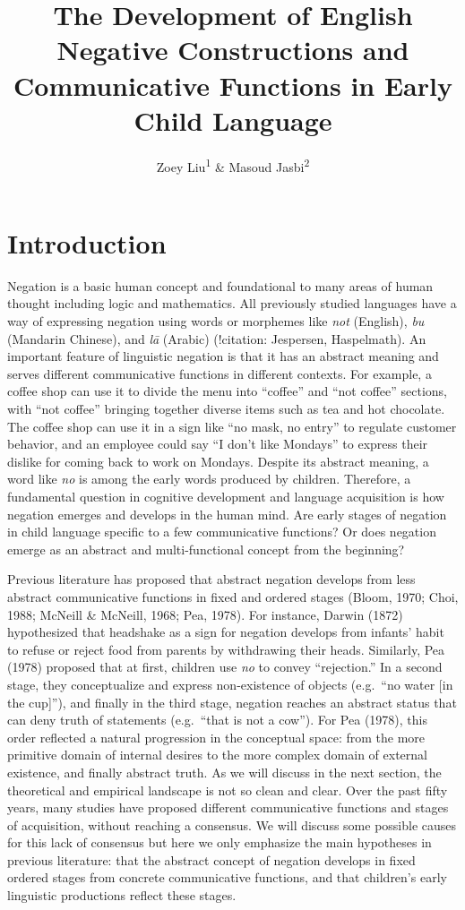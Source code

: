 \documentclass[
  english,
  man,floatsintext]{apa6}
\title{The Development of English Negative Constructions and Communicative Functions in Early Child Language}
\author{Zoey Liu\textsuperscript{1} \& Masoud Jasbi\textsuperscript{2}}
\date{}
\affiliation{\vspace{0.5cm}\textsuperscript{1} Boston College\\\textsuperscript{2} Uinversity of California, Davis}
\begin{document}
\maketitle

\hypertarget{introduction}{%
\section{Introduction}\label{introduction}}

Negation is a basic human concept and foundational to many areas of human thought including logic and mathematics. All previously studied languages have a way of expressing negation using words or morphemes like \emph{not} (English), \emph{bu} (Mandarin Chinese), and \emph{lā} (Arabic) (!citation: Jespersen, Haspelmath). An important feature of linguistic negation is that it has an abstract meaning and serves different communicative functions in different contexts. For example, a coffee shop can use it to divide the menu into ``coffee'' and ``not coffee'' sections, with ``not coffee'' bringing together diverse items such as tea and hot chocolate. The coffee shop can use it in a sign like ``no mask, no entry'' to regulate customer behavior, and an employee could say ``I don't like Mondays'' to express their dislike for coming back to work on Mondays. Despite its abstract meaning, a word like \emph{no} is among the early words produced by children. Therefore, a fundamental question in cognitive development and language acquisition is how negation emerges and develops in the human mind. Are early stages of negation in child language specific to a few communicative functions? Or does negation emerge as an abstract and multi-functional concept from the beginning?

Previous literature has proposed that abstract negation develops from less abstract communicative functions in fixed and ordered stages (Bloom, 1970; Choi, 1988; McNeill \& McNeill, 1968; Pea, 1978). For instance, Darwin (1872) hypothesized that headshake as a sign for negation develops from infants' habit to refuse or reject food from parents by withdrawing their heads. Similarly, Pea (1978) proposed that at first, children use \emph{no} to convey ``rejection.'' In a second stage, they conceptualize and express non-existence of objects (e.g.~``no water {[}in the cup{]}''), and finally in the third stage, negation reaches an abstract status that can deny truth of statements (e.g.~``that is not a cow''). For Pea (1978), this order reflected a natural progression in the conceptual space: from the more primitive domain of internal desires to the more complex domain of external existence, and finally abstract truth. As we will discuss in the next section, the theoretical and empirical landscape is not so clean and clear. Over the past fifty years, many studies have proposed different communicative functions and stages of acquisition, without reaching a consensus. We will discuss some possible causes for this lack of consensus but here we only emphasize the main hypotheses in previous literature: that the abstract concept of negation develops in fixed ordered stages from concrete communicative functions, and that children's early linguistic productions reflect these stages.
\end{document}
